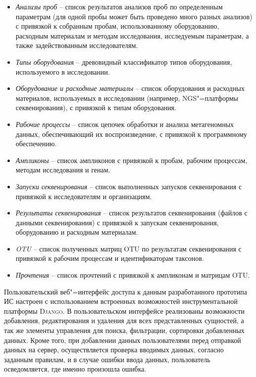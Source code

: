 \documentclass[a4paper,12pt,openany,final]{extreport}
\begin{document}
\begin{itemize}
\item \emph{Анализы проб} -- список результатов анализов проб по определенным параметрам (для одной пробы может быть проведено много разных анализов) с привязкой к собранным пробам, использованному оборудованию, расходным материалам и методам исследования, исследуемым параметрам, а также задействованным исследователям.
\item \emph{Типы оборудования} -- древовидный классификатор типов оборудования, используемого в исследовании.
\item \emph{Оборудование и расходные материалы} -- список оборудования и расходных материалов, используемых в исследовании (например, NGS"=платформы секвенирования), с привязкой к типам оборудования.
\item \emph{Рабочие процессы} -- список цепочек обработки и анализа метагеномных данных, обеспечивающий их воспроизведение, с привязкой к программному обеспечению.
\item \emph{Ампликоны} -- список ампликонов с привязкой к пробам, рабочим процессам, методам исследования и генам.
\item \emph{Запуски секвенирования} -- список выполненных запусков секвенирования с привязкой к исследователям и организациям.
\item \emph{Результаты секвенирования} -- список результатов секвенирования (файлов с данными секвенирования) с привязкой к запускам секвенирования, оборудованию и расходным материалам.
\item \emph{OTU} -- список полученных матриц OTU по результатам секвенирования с привязкой к рабочим процессам и идентификаторам таксонов.
\item \emph{Прочтения} -- список прочтений с привязкой к ампликонам и матрицам OTU.
\end{itemize}

Пользовательский веб"=интерфейс доступа к данным разработанного прототипа ИС настроен с использованием встроенных возможностей инструментальной платформы \textsc{Django}. В пользовательском интерфейсе реализованы возможности добавления, редактирования и удаления для всех представленных сущностей, а так же элементы управления для поиска, фильтрации, сортировки добавленных данных. Кроме того, при добавлении данных пользователями перед отправкой данных на сервер, осуществляется проверка вводимых данных, согласно заданным правилам, и в случае ошибки ввода данных, пользователь осведомляется, где именно произошла ошибка.
\end{document}
